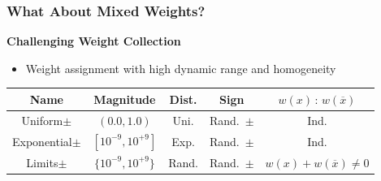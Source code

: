 \documentclass[t,pdf]{beamer}
\newcommand{\obar}[1]{\overline{#1}}
\newcommand{\rtext}[1]{\textcolor{xred}{#1}}
\begin{document}
\begin{frame}
  \frametitle{What About Mixed Weights?}

\medskip

  \textbf{Challenging Weight Collection}

\medskip

  \begin{itemize}
  \item
    Weight assignment with high dynamic range and homogeneity
  \end{itemize}

\medskip

\begin{center}
   \begin{tabular}{ccccc}
     Name & Magnitude  & Dist. & Sign & $w(x)\,:\,w(\obar{x})$ \\
     \midrule
     Uniform$\pm$      & $(0.0, 1.0)$     & Uni.  & Rand.~$\pm$   & Ind. \\[0.5em]
     Exponential$\pm$ & $[10^{-9}, 10^{+9}]$ & Exp. & Rand.~$\pm$ & Ind. \\[0.5em]
     \rtext{Limits$\pm$} & \rtext{$\{10^{-9}, 10^{+9}\}$} & \rtext{Rand.} & \rtext{Rand.~$\pm$} & \rtext{$w(x) + w(\obar{x}) \not = 0$} \\
   \end{tabular}
\end{center}

\medskip


\end{frame}
\end{document}
